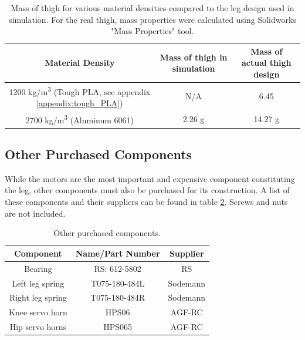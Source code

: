 \begin{table}[h!]
    \centering
    \begin{tabular}{|c|c|c|}
        \hline
        Material Density & Mass of thigh in simulation & Mass of actual thigh design \\ \hline
        1200 kg/m\textsuperscript{3} (Tough PLA, see appendix \ref{appendix:tough_PLA}) & N/A & 6.45 \\
        2700 kg/m\textsuperscript{3} (Aluminum 6061) & 2.26 g & 14.27 g \\
        \hline
    \end{tabular}
    \caption{Mass of thigh for various material densities compared to the leg design used in simulation. For the real thigh, mass properties were calculated using Solidworks "Mass Properties" tool. }
    \label{tab:thigh_mass_comparison}
\end{table}

\subsection{Other Purchased Components}

While the motors are the most important and expensive component constituting the leg, other components must also be purchased for its construction. A list of these components and their suppliers can be found in table \ref{tab:other_purchased_components}. Screws and nuts are not included. 

\begin{table}[h!]
    \centering
    \begin{tabular}{|c|c|c|}
        \hline
        Component & Name/Part Number & Supplier \\ \hline
        Bearing & RS: 612-5802 &  RS \\
        Left leg spring &  T075-180-484L & Sodemann\\
        Right leg spring &  T075-180-484R & Sodemann\\
        Knee servo horn & HPS06 & AGF-RC\\
        Hip servo horns & HPS065 & AGF-RC\\
        \hline
    \end{tabular}
    \caption{Other purchased components.}
    \label{tab:other_purchased_components}  
\end{table}
